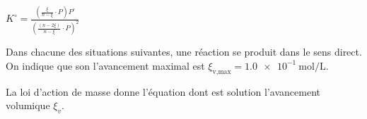 


\begin{enonce}
$K^\circ=\frac{\left(\frac{\xi}{n-\xi}\cdot P\right)P^\circ}{\left(\frac{(n-2\xi)}{n-\xi}\cdot P\right)^2}$
\end{enonce}






\finEntrainement



\newpage




\hauteurLargeurCadreReponse		{6mm}{18mm}
\initialisationEntrainement



Dans chacune des situations suivantes, une réaction se produit dans le sens direct. On indique que son  l'avancement maximal est $\xi_\text{v,max}=\SI{1,0e-1}{\mole\per\liter}$. 

La loi d'action de masse donne l'équation dont est solution l'avancement volumique $\xi_v$. 

